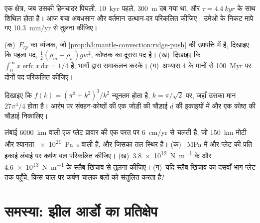 \begin{exercise}[$\star\star$]\label{exo:b3:mantle-convection:9}
एक क्षेत्र, जब उसकी हिमचादर पिघली, \qty{10}{kyr} पहले, \qty{300}{m} दब गया था,
और $\tau = \qty{4.4}{kyr}$ के साथ शिथिल होता है। आज बचा अवधसान और
वर्तमान उत्थान-दर परिकलित कीजिए। उमेओ के निकट मापे गए
\qty{10.3}{mm/yr} से तुलना कीजिए।
\end{exercise}

\begin{exercise}[$\star\star\star$]\label{exo:b3:mantle-convection:10}
(क)~$F_{rp}$ का व्यंजक, जो
\cref{prop:b3:mantle-convection:ridge-push} की उपपत्ति में है, दिखाइए कि पहला पद,
$\tfrac12(\rho_m - \rho_w)gw^2$, कोष्ठक का दूसरा पद है। (ख)~दिखाइए कि
$\int_0^\infty x\operatorname{erfc}x\,\mathrm dx = 1/4$ है, भागों द्वारा समाकलन करके।
(ग)~अभ्यास 4 के मानों से \qty{100}{Myr} पर दोनों पद परिकलित कीजिए।
\end{exercise}

\begin{exercise}[$\star\star\star$]\label{exo:b3:mantle-convection:11}
दिखाइए कि $f(k) = (\pi^2 + k^2)^3/k^2$ न्यूनतम होता है, $k = \pi/\sqrt2$ पर, जहाँ
उसका मान $27\pi^4/4$ होता है। आरंभ पर संवहन-कोष्ठों की एक जोड़ी की
चौड़ाई $d$ की इकाइयों में और एक कोष्ठ की चौड़ाई निकालिए।
\end{exercise}

\begin{exercise}[$\star\star\star$]\label{exo:b3:mantle-convection:12}
लंबाई \qty{6000}{km} वाली एक प्लेट प्रावार की एक परत पर \qty{6}{cm/yr} से चलती है,
जो \qty{150}{km} मोटी और श्यानता \qty{e20}{Pa.s} वाली है, और जिसका तल स्थिर है। (क)~
 \unit{MPa} में और प्लेट की प्रति इकाई लंबाई पर कर्षण बल परिकलित कीजिए।
(ख)~\qty{3.8e12}{N.m^{-1}} के  और
\qty{4.6e13}{N.m^{-1}} के स्लैब-खिंचाव से तुलना कीजिए। (ग)~यदि स्लैब-खिंचाव का दसवाँ भाग प्लेट तक पहुँचे,
किस चाल पर कर्षण चालक बलों को संतुलित करता है?
\end{exercise}

\section{समस्या: झील आर्डो का प्रतिक्षेप}


